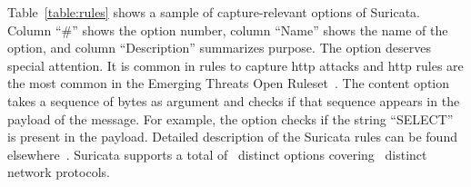 \documentclass[conference]{IEEEtran}
\begin{document}
Table~\ref{table:rules} shows a sample of capture-relevant options of
Suricata. Column ``\#'' shows the option number, column ``Name'' shows
the name of the option, and column ``Description'' summarizes
purpose. The option  deserves special attention. It is
common in rules to capture http attacks and http rules are the most
common in the Emerging Threats Open
Ruleset~\cite{emerging-threats-open}. The content option takes a
sequence of bytes as argument and checks if that sequence appears in
the payload of the message.  For example, the option
 checks if the string ``SELECT'' is present
in the payload.  Detailed description of the Suricata rules can be
found elsewhere~\cite{suri-rule-format}. Suricata supports a total of
\totoptions\ distinct options covering \numproto\ distinct network
protocols.




  
\end{document}
